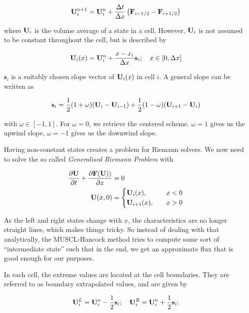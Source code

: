 \begin{equation}
\mathbf{U}_i^{n+1} =
	\mathbf{U}_i^n + \frac{\Delta t}{\Delta x} \left( \mathbf{F}_{i-1/2} - \mathbf{F}_{i + 1/2}
\right)
\end{equation}

where $\mathbf{U}_i$ is the volume average of a state in a cell. However, $\mathbf{U}_i$ is
not assumed to be constant throughout the cell, but is described by

\begin{equation}
\mathbf{U}_{i}(x) =
	\mathbf{U}_i^n + \frac{x - x_i}{\Delta x} \mathbf{s}_i;
	\quad x \in [0, \Delta x]
\end{equation}


$\mathbf{s}_i$ is a suitably chosen slope vector of $\mathbf{U}_i(x)$ in cell $i$.
A general slope can be written as

\begin{equation}
\mathbf{s}_i =
 	\frac{1}{2} (1 + \omega) (\mathbf{U}_i - \mathbf{U}_{i-1}) +
 	\frac{1}{2} (1 - \omega) (\mathbf{U}_{i+1} - \mathbf{U}_i)
\end{equation}

with $\omega \in [-1, 1]$. For $\omega = 0$, we retrieve the centered scheme.
$\omega = 1$ gives us the upwind slope, $\omega = -1$ gives us the downwind
slope.


Having non-constant states creates a problem for Riemann solvers. We now need
to solve the so called \emph{Generalised Riemann Problem} with

\begin{align}
	\frac{\partial \mathbf{U}}{\partial t} + \frac{\partial \mathbf{F}(\mathbf{U}))}{\partial x} &= 0 \\
	\mathbf{U}(x, 0) &= 
	\begin{cases}
		\mathbf{U}_i(x), & \quad x < 0 \\
		\mathbf{U}_{i+1}(x), & \quad x > 0 \\
	\end{cases}
\end{align}

As the left and right states change with $x$, the characteristics are no longer
straight lines, which makes things tricky. So instead of dealing with that
analytically, the MUSCL-Hancock method tries to compute some sort of
``intermediate state'' such that in the end, we get an approximate flux that is
good enough for our purposes.

In each cell, the extreme values are located at the cell boundaries.
They are referred to as boundary extrapolated values, and are given by

\begin{equation}
	\mathbf{U}_i^L = \mathbf{U}_i^n - \frac{1}{2} \mathbf{s}_i;
	\quad
	\mathbf{U}_i^R = \mathbf{U}_i^n + \frac{1}{2} \mathbf{s}_i;
\end{equation}


